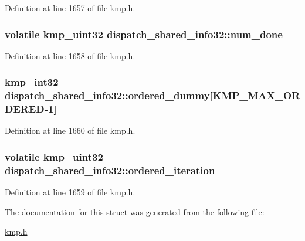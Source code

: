 Definition at line 1657 of file kmp.\-h.

\hypertarget{structdispatch__shared__info32_ab2d5d2c56afd2fae3393d125678b3ca4}{
\subsubsection[{num\-\_\-done}]{\setlength{\rightskip}{0pt plus 5cm}volatile kmp\-\_\-uint32 dispatch\-\_\-shared\-\_\-info32\-::num\-\_\-done}}\label{structdispatch__shared__info32_ab2d5d2c56afd2fae3393d125678b3ca4}


Definition at line 1658 of file kmp.\-h.

\hypertarget{structdispatch__shared__info32_ae4ef1980d5d99374fc19214e3bdbf5b6}{
\subsubsection[{ordered\-\_\-dummy}]{\setlength{\rightskip}{0pt plus 5cm}kmp\-\_\-int32 dispatch\-\_\-shared\-\_\-info32\-::ordered\-\_\-dummy\mbox{[}{\bf K\-M\-P\-\_\-\-M\-A\-X\-\_\-\-O\-R\-D\-E\-R\-E\-D}-\/1\mbox{]}}}\label{structdispatch__shared__info32_ae4ef1980d5d99374fc19214e3bdbf5b6}


Definition at line 1660 of file kmp.\-h.

\hypertarget{structdispatch__shared__info32_a7ac74e8bb8348a7516917151ab987332}{
\subsubsection[{ordered\-\_\-iteration}]{\setlength{\rightskip}{0pt plus 5cm}volatile kmp\-\_\-uint32 dispatch\-\_\-shared\-\_\-info32\-::ordered\-\_\-iteration}}\label{structdispatch__shared__info32_a7ac74e8bb8348a7516917151ab987332}


Definition at line 1659 of file kmp.\-h.



The documentation for this struct was generated from the following file\-:\begin{DoxyCompactItemize}
\item 
\hyperlink{kmp_8h}{kmp.\-h}\end{DoxyCompactItemize}
